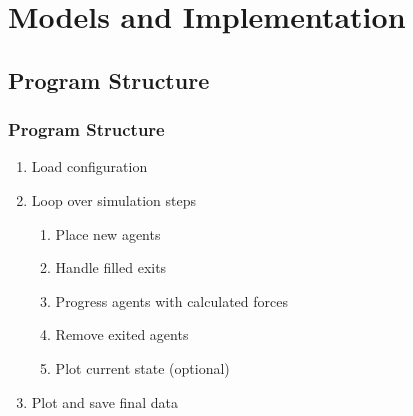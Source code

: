 \documentclass{beamer}
\begin{document}
\section{Models and Implementation}

\subsection{Program Structure}
\begin{frame}
	\frametitle{Program Structure}
	\begin{enumerate}
		\item Load configuration
		\item Loop over simulation steps
		\begin{enumerate}
			\item Place new agents
			\item Handle filled exits
			\item Progress agents with calculated forces
			\item Remove exited agents
			\item Plot current state (optional)
		\end{enumerate}
		\item Plot and save final data
	\end{enumerate}
\end{frame}

\end{document}
